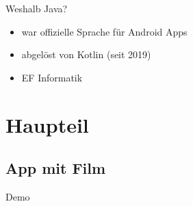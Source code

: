 \documentclass[aspectratio=169]{beamer}
\begin{document}
\begin{frame}[plain]{Weshalb Java?}
\begin{varwidth}{.3\textwidth}
\begin{figure}
        \end{figure}
    \end{varwidth}
    \hfill
    \begin{varwidth}{.6\textwidth}
        \begin{itemize}\pause
            \item war offizielle Sprache für Android Apps\pause
            \item abgelöst von Kotlin (seit 2019)\pause
            \item EF Informatik
        \end{itemize}
    \end{varwidth} 
\end{frame}

\section{Haupteil}
\subsection{App mit Film}
\begin{frame}[plain]{Demo}
    \begin{figure}[h]
        \centering
    \end{figure}
\end{frame}
\end{document}
